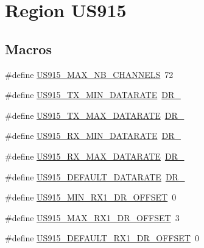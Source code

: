 \hypertarget{group__REGIONUS915}{}\section{Region U\+S915}
\label{group__REGIONUS915}
\subsection*{Macros}
\begin{DoxyCompactItemize}
\item 
\#define \hyperlink{group__REGIONUS915_ga417ab6531cbaef476634d7ba0b04c20f}{U\+S915\+\_\+\+M\+A\+X\+\_\+\+N\+B\+\_\+\+C\+H\+A\+N\+N\+E\+LS}~72
\item 
\#define \hyperlink{group__REGIONUS915_ga82ad1f3ace520fc55727e442784bdcb6}{U\+S915\+\_\+\+T\+X\+\_\+\+M\+I\+N\+\_\+\+D\+A\+T\+A\+R\+A\+TE}~\hyperlink{group__REGION_ga6c4ef966b4f3d5eb7597b087f2b97095}{D\+R\+\_}
\item 
\#define \hyperlink{group__REGIONUS915_gafe9e1c8956875cd7ccdb8aec59ee6f9d}{U\+S915\+\_\+\+T\+X\+\_\+\+M\+A\+X\+\_\+\+D\+A\+T\+A\+R\+A\+TE}~\hyperlink{group__REGION_ga6ceba6158a7dab238e9d0b846fb47a0c}{D\+R\+\_}
\item 
\#define \hyperlink{group__REGIONUS915_ga44b4b0c33d7fbd6190937e2608b8ae71}{U\+S915\+\_\+\+R\+X\+\_\+\+M\+I\+N\+\_\+\+D\+A\+T\+A\+R\+A\+TE}~\hyperlink{group__REGION_ga44cc96ba80ae464cd9330b784d329c16}{D\+R\+\_}
\item 
\#define \hyperlink{group__REGIONUS915_ga01e1ec534d6632367f457fac9488a1a2}{U\+S915\+\_\+\+R\+X\+\_\+\+M\+A\+X\+\_\+\+D\+A\+T\+A\+R\+A\+TE}~\hyperlink{group__REGION_ga226f47470cc69a6fe831f7c92709bc1f}{D\+R\+\_}
\item 
\#define \hyperlink{group__REGIONUS915_ga30e4c5d41d52805a1ea76717e867d625}{U\+S915\+\_\+\+D\+E\+F\+A\+U\+L\+T\+\_\+\+D\+A\+T\+A\+R\+A\+TE}~\hyperlink{group__REGION_ga6c4ef966b4f3d5eb7597b087f2b97095}{D\+R\+\_}
\item 
\#define \hyperlink{group__REGIONUS915_gac1d58ceae4ccf7be5aa7d89fa9cb9321}{U\+S915\+\_\+\+M\+I\+N\+\_\+\+R\+X1\+\_\+\+D\+R\+\_\+\+O\+F\+F\+S\+ET}~0
\item 
\#define \hyperlink{group__REGIONUS915_gab5445433062754a147e74e8c325aa3b9}{U\+S915\+\_\+\+M\+A\+X\+\_\+\+R\+X1\+\_\+\+D\+R\+\_\+\+O\+F\+F\+S\+ET}~3
\item 
\#define \hyperlink{group__REGIONUS915_ga84622bf421ab1e647c7b728013521baf}{U\+S915\+\_\+\+D\+E\+F\+A\+U\+L\+T\+\_\+\+R\+X1\+\_\+\+D\+R\+\_\+\+O\+F\+F\+S\+ET}~0

\end{DoxyCompactItemize}
